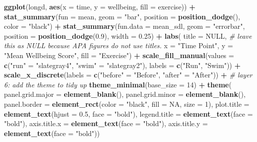 \documentclass[
]{book}
\newenvironment{Shaded}{\begin{snugshade}}{\end{snugshade}}
\newcommand{\AttributeTok}[1]{\textcolor[rgb]{0.13,0.29,0.53}{#1}}
\newcommand{\CommentTok}[1]{\textcolor[rgb]{0.56,0.35,0.01}{\textit{#1}}}
\newcommand{\ConstantTok}[1]{\textcolor[rgb]{0.56,0.35,0.01}{#1}}
\newcommand{\DecValTok}[1]{\textcolor[rgb]{0.00,0.00,0.81}{#1}}
\newcommand{\FloatTok}[1]{\textcolor[rgb]{0.00,0.00,0.81}{#1}}
\newcommand{\FunctionTok}[1]{\textcolor[rgb]{0.13,0.29,0.53}{\textbf{#1}}}
\newcommand{\NormalTok}[1]{#1}
\newcommand{\OtherTok}[1]{\textcolor[rgb]{0.56,0.35,0.01}{#1}}
\newcommand{\SpecialCharTok}[1]{\textcolor[rgb]{0.81,0.36,0.00}{\textbf{#1}}}
\newcommand{\StringTok}[1]{\textcolor[rgb]{0.31,0.60,0.02}{#1}}
\begin{document}
\begin{Shaded}
\begin{Highlighting}[]
\FunctionTok{ggplot}\NormalTok{(longd, }\FunctionTok{aes}\NormalTok{(}\AttributeTok{x =}\NormalTok{ time, }\AttributeTok{y =}\NormalTok{ wellbeing, }\AttributeTok{fill =}\NormalTok{ exercise)) }\SpecialCharTok{+}
  \FunctionTok{stat\_summary}\NormalTok{(}\AttributeTok{fun =}\NormalTok{ mean, }\AttributeTok{geom =} \StringTok{"bar"}\NormalTok{, }\AttributeTok{position =} \FunctionTok{position\_dodge}\NormalTok{(), }\AttributeTok{color =} \StringTok{"black"}\NormalTok{) }\SpecialCharTok{+}
  \FunctionTok{stat\_summary}\NormalTok{(}\AttributeTok{fun.data =}\NormalTok{ mean\_sdl, }\AttributeTok{geom =} \StringTok{"errorbar"}\NormalTok{, }
               \AttributeTok{position =} \FunctionTok{position\_dodge}\NormalTok{(}\FloatTok{0.9}\NormalTok{), }\AttributeTok{width =} \FloatTok{0.25}\NormalTok{) }\SpecialCharTok{+}
  \FunctionTok{labs}\NormalTok{(}
    \AttributeTok{title =} \ConstantTok{NULL}\NormalTok{,   }\CommentTok{\# leave this as NULL because APA figures do not use titles.}
    \AttributeTok{x =} \StringTok{"Time Point"}\NormalTok{,  }
    \AttributeTok{y =} \StringTok{"Mean Wellbeing Score"}\NormalTok{,}
    \AttributeTok{fill =} \StringTok{"Exercise"}\NormalTok{) }\SpecialCharTok{+}
  \FunctionTok{scale\_fill\_manual}\NormalTok{(}\AttributeTok{values =} \FunctionTok{c}\NormalTok{(}\StringTok{"run"} \OtherTok{=} \StringTok{"slategray4"}\NormalTok{, }\StringTok{"swim"} \OtherTok{=} \StringTok{"slategray2"}\NormalTok{), }
                    \AttributeTok{labels =} \FunctionTok{c}\NormalTok{(}\StringTok{"Run"}\NormalTok{, }\StringTok{"Swim"}\NormalTok{)) }\SpecialCharTok{+}
  \FunctionTok{scale\_x\_discrete}\NormalTok{(}\AttributeTok{labels =} \FunctionTok{c}\NormalTok{(}\StringTok{"before"} \OtherTok{=} \StringTok{"Before"}\NormalTok{, }\StringTok{"after"} \OtherTok{=} \StringTok{"After"}\NormalTok{)) }\SpecialCharTok{+}
  \CommentTok{\# layer 6: add the theme to tidy up}
  \FunctionTok{theme\_minimal}\NormalTok{(}\AttributeTok{base\_size =} \DecValTok{14}\NormalTok{) }\SpecialCharTok{+}
  \FunctionTok{theme}\NormalTok{(}
    \AttributeTok{panel.grid.major =} \FunctionTok{element\_blank}\NormalTok{(),}
    \AttributeTok{panel.grid.minor =} \FunctionTok{element\_blank}\NormalTok{(),}
    \AttributeTok{panel.border =} \FunctionTok{element\_rect}\NormalTok{(}\AttributeTok{color =} \StringTok{"black"}\NormalTok{, }\AttributeTok{fill =} \ConstantTok{NA}\NormalTok{, }\AttributeTok{size =} \DecValTok{1}\NormalTok{),}
    \AttributeTok{plot.title =} \FunctionTok{element\_text}\NormalTok{(}\AttributeTok{hjust =} \FloatTok{0.5}\NormalTok{, }\AttributeTok{face =} \StringTok{"bold"}\NormalTok{),}
    \AttributeTok{legend.title =} \FunctionTok{element\_text}\NormalTok{(}\AttributeTok{face =} \StringTok{"bold"}\NormalTok{),}
    \AttributeTok{axis.title.x =} \FunctionTok{element\_text}\NormalTok{(}\AttributeTok{face =} \StringTok{"bold"}\NormalTok{),}
    \AttributeTok{axis.title.y =} \FunctionTok{element\_text}\NormalTok{(}\AttributeTok{face =} \StringTok{"bold"}\NormalTok{))}
\end{Highlighting}
\end{Shaded}
\end{document}
